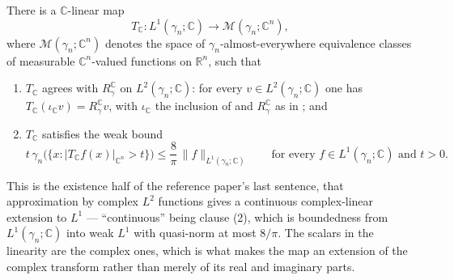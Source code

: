 \begin{lemma}
There is a $\mathbb{C}$-linear map
\[
  T_{\mathbb{C}} : L^1(\gamma_n;\mathbb{C}) \longrightarrow
    \mathcal{M}(\gamma_n;\mathbb{C}^n),
\]
where $\mathcal{M}(\gamma_n;\mathbb{C}^n)$ denotes the space of
$\gamma_n$-almost-everywhere equivalence classes of measurable
$\mathbb{C}^n$-valued functions on $\mathbb{R}^n$, such that
\begin{enumerate}
\item $T_{\mathbb{C}}$ agrees with $R_\gamma^{\mathbb{C}}$ on
  $L^2(\gamma_n;\mathbb{C})$: for every $v \in L^2(\gamma_n;\mathbb{C})$ one has
  $T_{\mathbb{C}}(\iota_{\mathbb{C}} v) = R_\gamma^{\mathbb{C}} v$, with
  $\iota_{\mathbb{C}}$ the inclusion of  and
  $R_\gamma^{\mathbb{C}}$ as in ; and
\item $T_{\mathbb{C}}$ satisfies the weak bound
\[
  t\,\gamma_n\bigl(\{x : |T_{\mathbb{C}}f(x)|_{\mathbb{C}^n} > t\}\bigr)
    \leq \frac{8}{\pi}\,\|f\|_{L^1(\gamma_n;\mathbb{C})}
  \qquad\text{for every } f \in L^1(\gamma_n;\mathbb{C}) \text{ and } t > 0 .
\]
\end{enumerate}

This is the existence half of the reference paper's last sentence, that
approximation by complex $L^2$ functions gives a continuous complex-linear
extension to $L^1$ --- ``continuous'' being clause (2), which is boundedness
from $L^1(\gamma_n;\mathbb{C})$ into weak $L^1$ with quasi-norm at most $8/\pi$.
The scalars in the linearity are the complex ones, which is what makes the map
an extension of the complex transform rather than merely of its real and
imaginary parts.
\end{lemma}
